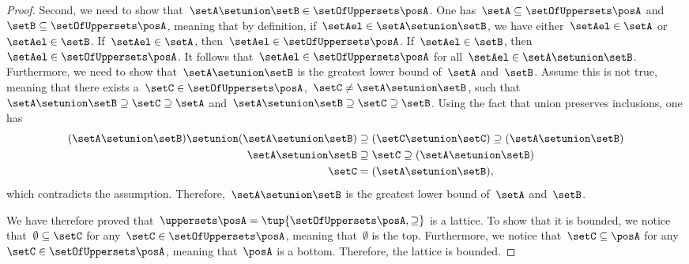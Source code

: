 \begin{proof}
        Second, we need to show that~$\setA\setunion \setB\in \setOfUppersets \posA$.
        One has~$\setA\subseteq \setOfUppersets \posA$ and~$\setB \subseteq \setOfUppersets \posA$, meaning that by definition, if~$\setAel\in \setA\setunion \setB$, we have either~$\setAel\in \setA$ or~$\setAel\in \setB$.
        If~$\setAel\in \setA$, then~$\setAel\in \setOfUppersets \posA$.
        If~$\setAel\in \setB$, then~$\setAel \in \setOfUppersets \posA$.
        It follows that~$\setAel \in \setOfUppersets \posA$ for all~$\setAel\in \setA\setunion \setB$.
        Furthermore, we need to show that~$\setA\setunion \setB$ is the greatest lower bound of~$\setA$ and~$\setB$.
        Assume this is not true, meaning that there exists a~$\setC\in \setOfUppersets \posA$,~$\setC\neq \setA\setunion \setB$, such that~$\setA\setunion \setB\supseteq \setC\supseteq \setA$ and~$\setA\setunion \setB\supseteq \setC\supseteq \setB$.
        Using the fact that union preserves inclusions, one has
        \begin{equation}
            \begin{aligned}
                (\setA\setunion \setB)
                \setunion (\setA\setunion \setB) & \supseteq (\setC \setunion \setC) \supseteq (\setA\setunion \setB) \\
                \setA\setunion \setB             & \supseteq \setC\supseteq (\setA\setunion \setB )                   \\
                \setC                            & =(\setA\setunion \setB),
            \end{aligned}
        \end{equation}
        which contradicts the assumption.
        Therefore,~$\setA\setunion \setB$ is the greatest lower bound of~$\setA$ and~$\setB$.

        We have therefore proved that~$\uppersets \posA=\tup{\setOfUppersets \posA,\supseteq}$ is a lattice.
        To show that it is bounded, we notice that~$\emptyset \subseteq \setC$ for any~$\setC\in \setOfUppersets \posA$, meaning that~$\emptyset$ is the top.
        Furthermore, we notice that~$\setC\subseteq \posA$ for any~$\setC\in \setOfUppersets \posA$, meaning that~$\posA$ is a bottom.
    Therefore, the lattice is bounded.
\end{proof}


